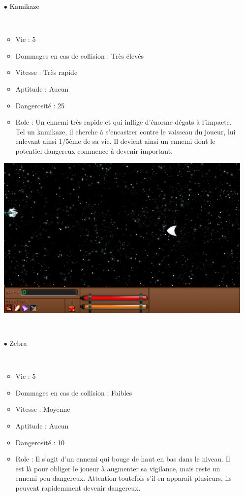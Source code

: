 \begin{itemize}
				\par~
			\item[$\bullet$ Kamikaze]
				\par~
				\begin{itemize}			
					\item Vie : 5
					\item Dommages en cas de collision : Très élevés
					\item Vitesse : Très rapide
					\item Aptitude : Aucun
					\item Dangerosité : 25%
					\item Role : Un ennemi très rapide et qui inflige d'énorme dégats à l'impacte. Tel un kamikaze, il cherche à s'encastrer contre le vaisseau du joueur, lui enlevant ainsi 1/5ème de sa vie. Il devient ainsi un ennemi dont le potentiel dangereux commence à devenir important.
				\end{itemize}
				\includegraphics{images/vaisseaux/kamikaze.png}
				\par~
					\item[$\bullet$ Zebra]
				\par~
				\begin{itemize}
					\item Vie : 5
					\item Dommages en cas de collision : Faibles
					\item Vitesse : Moyenne
					\item Aptitude : Aucun
					\item Dangerosité : 10%
					\item Role : Il s'agit d'un ennemi qui bouge de haut en bas dans le niveau. Il est là pour obliger le joueur à augmenter sa vigilance, mais reste un ennemi peu dangereux. Attention toutefois s'il en apparait plusieurs, ils peuvent rapidemment devenir dangereux.

\end{itemize}
\end{itemize}
